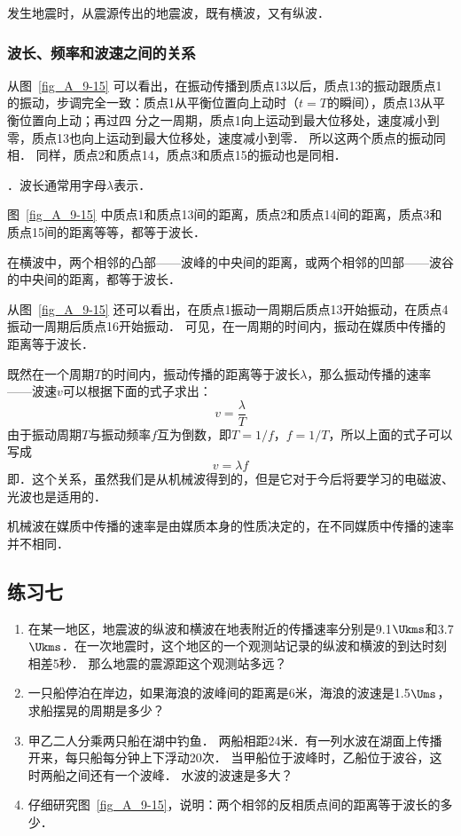 发生地震时，从震源传出的地震波，既有横波，又有纵波．

\subsubsection{波长、频率和波速之间的关系}

从图~\ref{fig_A_9-15} 可以看出，在振动传播到质点13以后，质点13的振动跟质点1的振动，步调完全一致：质点1从平衡位置向上动时（$t=T$的瞬间），质点13从平衡位置向上动；再过四
分之一周期，质点1向上运动到最大位移处，速度减小到零，质点13也向上运动到最大位移处，速度减小到零．
所以这两个质点的振动同相．
同样，质点2和质点14，质点3和质点15的振动也是同相．

．波长通常用字母$\lambda$表示．

图~\ref{fig_A_9-15} 中质点1和质点13间的距离，质点2和质点14间的距离，质点3和质点15间的距离等等，都等于波长．

在横波中，两个相邻的凸部——波峰的中央间的距离，或两个相邻的凹部——波谷的中央间的距离，都等于波长．

从图~\ref{fig_A_9-15} 还可以看出，在质点1振动一周期后质点13开始振动，在质点4振动一周期后质点16开始振动．
可见，在一周期的时间内，振动在媒质中传播的距离等于波长．

既然在一个周期$T$的时间内，振动传播的距离等于波长$\lambda$，那么振动传播的速率——波速$v$可以根据下面的式子求出：
\[v=\frac{\lambda}{T}\]
由于振动周期$T$与振动频率$f$互为倒数，即$T=1/f$，$f=1/T$，所以上面的式子可以写成
\[v=\lambda f\]
即．这个关系，虽然我们是从机械波得到的，但是它对于今后将要学习的电磁波、光波也是适用的．

机械波在媒质中传播的速率是由媒质本身的性质决定的，在不同媒质中传播的速率并不相同．

\subsection*{练习七}
\begin{enumerate}
    \item 在某一地区，地震波的纵波和横波在地表附近的传播速率分别是9.1$\Ukms$和3.7$\Ukms$．在一次地震时，这个地区的一个观测站记录的纵波和横波的到达时刻相差5秒．
    那么地震的震源距这个观测站多远？
    \item 一只船停泊在岸边，如果海浪的波峰间的距离是6米，海浪的波速是1.5$\Ums$，求船摆晃的周期是多少？
    \item 甲乙二人分乘两只船在湖中钓鱼．
    两船相距24米．有一列水波在湖面上传播开来，每只船每分钟上下浮动20次．
    当甲船位于波峰时，乙船位于波谷，这时两船之间还有一个波峰．
    水波的波速是多大？
    \item 仔细研究图~\ref{fig_A_9-15}，说明：两个相邻的反相质点间的距离等于波长的多少．
\end{enumerate}

